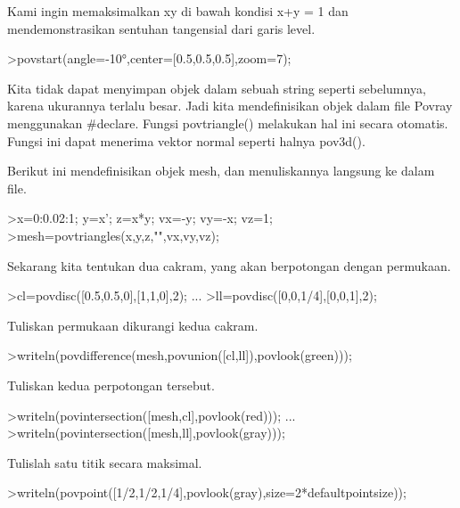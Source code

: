\documentclass[a4paper,10pt]{article}
\begin{document}
\begin{eulernotebook}
\begin{eulercomment}
\begin{eulercomment}
\begin{eulercomment}
\begin{eulercomment}
\begin{eulercomment}
\begin{eulercomment}
\begin{eulercomment}
\begin{eulercomment}
\begin{eulercomment}
\begin{eulercomment}
\begin{eulercomment}
\begin{eulercomment}
\begin{eulercomment}
\begin{eulercomment}
\begin{eulercomment}
\begin{eulercomment}
\begin{eulercomment}
Kami ingin memaksimalkan xy di bawah kondisi x+y = 1 dan
mendemonstrasikan sentuhan tangensial dari garis level.
\end{eulercomment}
\begin{eulerprompt}
>povstart(angle=-10°,center=[0.5,0.5,0.5],zoom=7);
\end{eulerprompt}
\begin{eulercomment}
Kita tidak dapat menyimpan objek dalam sebuah string seperti
sebelumnya, karena ukurannya terlalu besar. Jadi kita mendefinisikan
objek dalam file Povray menggunakan #declare. Fungsi povtriangle()
melakukan hal ini secara otomatis. Fungsi ini dapat menerima vektor
normal seperti halnya pov3d().

Berikut ini mendefinisikan objek mesh, dan menuliskannya langsung ke
dalam file.
\end{eulercomment}
\begin{eulerprompt}
>x=0:0.02:1; y=x'; z=x*y; vx=-y; vy=-x; vz=1;
>mesh=povtriangles(x,y,z,"",vx,vy,vz);
\end{eulerprompt}
\begin{eulercomment}
Sekarang kita tentukan dua cakram, yang akan berpotongan dengan
permukaan.
\end{eulercomment}
\begin{eulerprompt}
>cl=povdisc([0.5,0.5,0],[1,1,0],2); ...
>ll=povdisc([0,0,1/4],[0,0,1],2);
\end{eulerprompt}
\begin{eulercomment}
Tuliskan permukaan dikurangi kedua cakram.
\end{eulercomment}
\begin{eulerprompt}
>writeln(povdifference(mesh,povunion([cl,ll]),povlook(green)));
\end{eulerprompt}
\begin{eulercomment}
Tuliskan kedua perpotongan tersebut.
\end{eulercomment}
\begin{eulerprompt}
>writeln(povintersection([mesh,cl],povlook(red))); ...
>writeln(povintersection([mesh,ll],povlook(gray)));
\end{eulerprompt}
\begin{eulercomment}
Tulislah satu titik secara maksimal.
\end{eulercomment}
\begin{eulerprompt}
>writeln(povpoint([1/2,1/2,1/4],povlook(gray),size=2*defaultpointsize));
\end{eulerprompt}
\begin{eulercomment}

\end{eulercomment}
\end{eulercomment}
\end{eulercomment}
\end{eulercomment}
\end{eulercomment}
\end{eulercomment}
\end{eulercomment}
\end{eulercomment}
\end{eulercomment}
\end{eulercomment}
\end{eulercomment}
\end{eulercomment}
\end{eulercomment}
\end{eulercomment}
\end{eulercomment}
\end{eulercomment}
\end{eulercomment}
\end{eulernotebook}
\end{document}
